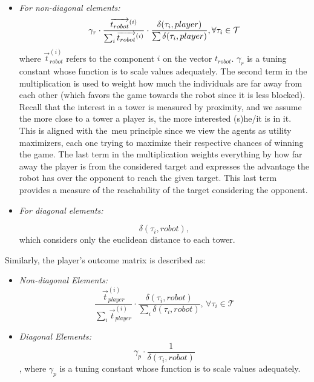 \begin{itemize}
\item \textit{For non-diagonal elements:}\\

\begin{equation}
    \label{eq:Non-diagonal}
    \gamma_r \cdot \frac{\overrightarrow{t_{robot}}^{(i)}}{\sum_{i}{\overrightarrow{t_{robot}}^{(i)}}} \cdot \frac{\delta(\tau_{i},player)}{\sum{\delta(\tau_{i},player)}}, \forall\tau_{i} \in \mathcal{T}\\ 
\end{equation}
where $\overrightarrow{t}^{(i)}_{robot}$ refers to the component $i$ on the vector $t_{robot}$. $\gamma_r$ is a tuning constant whose function is to scale values adequately. The second term in the multiplication is used to weight how much the individuals are far away from each other (which favors the game towards the robot since it is less blocked). Recall that the interest in a tower is measured by proximity, and we assume the more close to a tower a player is, the more interested (s)he/it is in it. This is aligned with the~\gls{meu} principle since we view the agents as utility maximizers, each one trying to maximize their respective chances of winning the game. The last term in the multiplication weights everything by how far away the player is from the considered target and expresses the advantage the robot has over the opponent to reach the given target. This last term provides a measure of the reachability of the target considering the opponent.

\item \textit{For diagonal elements:}

\begin{equation}
    \label{eq:Diagonal}
    \delta(\tau_{i},robot),
\end{equation}
 which considers only the euclidean distance to each tower.
\end{itemize}

Similarly, the player's outcome matrix is described as:
\begin{itemize}
    \item \textit{Non-diagonal Elements:}\\
        \begin{equation}
            \label{for:Non-DiagonalPlayer}
            \frac{\overrightarrow{t}^{(i)}_{player}}{\sum_{i}{\overrightarrow{t}^{(i)}_{player}}} \cdot \frac{\delta(\tau_{i},robot)}{\sum_{i}{\delta(\tau_{i},robot)}}, \, \forall\tau_{i} \in \mathcal{T} 
        \end{equation}
    \item \textit{Diagonal Elements:}
        \begin{equation}
            \label{for:DiagonalPlayer}
            \gamma_p \cdot \frac{1}{\delta(\tau_{i},robot)}
        \end{equation},
        where $\gamma_p$ is a tuning constant whose function is to scale values adequately.
\end{itemize}

